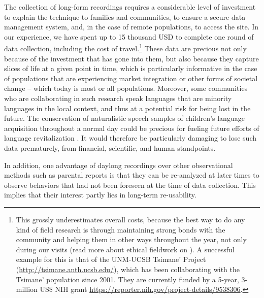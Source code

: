 \documentclass[smallextended]{svjour3}       %
\begin{document}
The collection of long-form recordings requires a considerable level of investment to explain the technique to families and communities, to ensure a secure data management system, and, in the case of remote populations, to access the site. In our experience, we have spent up to 15 thousand USD to complete one round of data collection, including the cost of travel.\footnote{This grossly underestimates overall costs, because the best way to do any kind of field research is through maintaining strong bonds with the community and helping them in other ways throughout the year, not only during our visits (read more about ethical fieldwork on \citealt{broesch2020navigating}). A successful example for this is that of the UNM-UCSB Tsimane' Project (\url{http://tsimane.anth.ucsb.edu/}), which has been collaborating with the Tsimane' population since 2001. They are currently funded by a 5-year, 3-million US\$ NIH grant \url{https://reporter.nih.gov/project-details/9538306}. } These data are precious not only because of the investment that has gone into them, but also because they capture slices of life at a given point in time, which is particularly informative in the case of populations that are experiencing market integration or other forms of societal change -- which today is most or all populations. Moreover, some communities who are collaborating in such research speak languages that are minority languages in the local context, and thus at a potential risk for being lost in the future. The conservation of naturalistic speech samples of children's language acquisition throughout a normal day could be precious for fueling future efforts of language revitalization \citep{Nee2021}. It would therefore be particularly damaging to lose such data prematurely, from  financial,  scientific, and  human standpoints.

In addition, one advantage of daylong recordings over other observational methods such as parental reports is that they can be re-analyzed at later times to observe behaviors that had not been foreseen at the time of data collection. This implies that their interest partly lies in long-term re-usability.
\end{document}
